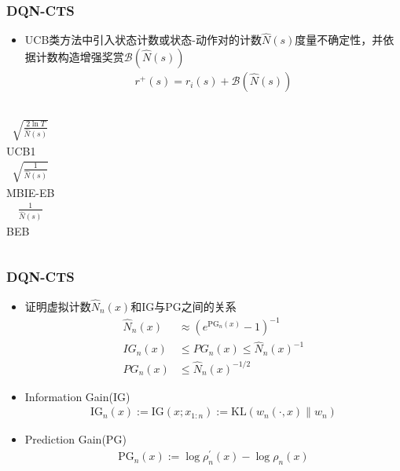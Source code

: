 \documentclass{beamer}
\begin{document}
\begin{CJK*}{GBK}{hei}
\begin{frame}\frametitle{DQN-CTS}
\begin{itemize}
\item UCB类方法中引入状态计数或状态-动作对的计数$\hat{N}(s)$度量不确定性，并依据计数构造增强奖赏$\mathcal{B}(\hat{N}(s))$
\begin{align*}
    r^{+}(s)=r_{i}(s)+\mathcal{B}(\hat{N}(s))
\end{align*}
\end{itemize}
\begin{columns}
\begin{align*}
\sqrt{\frac{2 \ln T}{\hat{N}(s)}}
\end{align*}
UCB1\\ \citep{Auer2002FinitetimeAO}
\begin{align*}
    \sqrt{\frac{1}{\hat{N}(s)}}
\end{align*}
MBIE-EB\\ \citep{Strehl2008AnAO}
\begin{align*}
    \frac{1}{\hat{N}(s)}
\end{align*}
BEB\\ \citep{Kolter2009RegularizationAF}
\end{columns}
\end{frame}


\begin{frame}\frametitle{DQN-CTS}
\begin{itemize}
\item \citep{Bellemare2016}证明虚拟计数$\hat{N}_{n}(x)$和$\mathrm{IG}$与$\mathrm{PG}$之间的关系
        \begin{align*}
            \hat{N}_{n}(x) &\approx\left(e^{\mathrm{PG}_{n}(x)}-1\right)^{-1}\\
            I G_{n}(x) &\leq P G_{n}(x) \leq \hat{N}_{n}(x)^{-1}\\
            P G_{n}(x) &\leq \hat{N}_{n}(x)^{-1 / 2}
        \end{align*}
\item Information Gain($\mathrm{IG}$)
        \begin{align*}
            \mathrm{IG}_{n}(x):=\mathrm{IG}\left(x ; x_{1: n}\right):=\mathrm{KL}\left(w_{n}(\cdot, x) \| w_{n}\right)
        \end{align*}
\item Prediction Gain($\mathrm{PG}$)
        \begin{align*}
            \mathrm{PG}_{n}(x):=\log \rho_{n}^{\prime}(x)-\log \rho_{n}(x)
        \end{align*}
\end{itemize}
\end{frame}


\end{CJK*}
\end{document}
